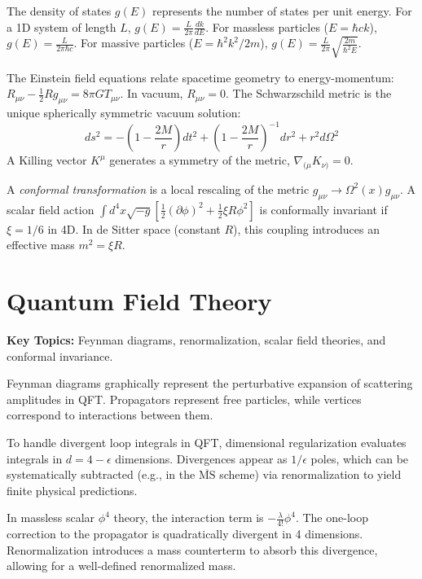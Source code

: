 \begin{definition}
The density of states $g(E)$ represents the number of states per unit energy. For a 1D system of length $L$, $g(E) = \frac{L}{2\pi} \frac{dk}{dE}$. For massless particles ($E = \hbar c k$), $g(E) = \frac{L}{2\pi \hbar c}$. For massive particles ($E = \hbar^2 k^2 / 2m$), $g(E) = \frac{L}{2\pi} \sqrt{\frac{2m}{\hbar^2 E}}$.
\end{definition}

\begin{definition}
The Einstein field equations relate spacetime geometry to energy-momentum: $R_{\mu\nu} - \frac{1}{2} R g_{\mu\nu} = 8\pi G T_{\mu\nu}$. In vacuum, $R_{\mu\nu} = 0$. The Schwarzschild metric is the unique spherically symmetric vacuum solution:
\[ ds^2 = -\left(1 - \frac{2M}{r}\right) dt^2 + \left(1 - \frac{2M}{r}\right)^{-1} dr^2 + r^2 d\Omega^2 \]
A Killing vector $K^\mu$ generates a symmetry of the metric, $\nabla_{(\mu} K_{\nu)} = 0$.
\end{definition}

\begin{definition}
A \emph{conformal transformation} is a local rescaling of the metric $g_{\mu\nu} \to \Omega^2(x) g_{\mu\nu}$. A scalar field action $\int d^4x \sqrt{-g} [\frac{1}{2}(\partial \phi)^2 + \frac{1}{2} \xi R \phi^2]$ is conformally invariant if $\xi = 1/6$ in 4D. In de Sitter space (constant $R$), this coupling introduces an effective mass $m^2 = \xi R$.
\end{definition}

\section{Quantum Field Theory}

\textbf{Key Topics:} Feynman diagrams, renormalization, scalar field theories, and conformal invariance.

\begin{definition}
Feynman diagrams graphically represent the perturbative expansion of scattering amplitudes in QFT. Propagators represent free particles, while vertices correspond to interactions between them.
\end{definition}

\begin{theorem}
To handle divergent loop integrals in QFT, dimensional regularization evaluates integrals in $d=4-\epsilon$ dimensions. Divergences appear as $1/\epsilon$ poles, which can be systematically subtracted (e.g., in the $\overline{\text{MS}}$ scheme) via renormalization to yield finite physical predictions.
\end{theorem}

\begin{example}
In massless scalar $\phi^4$ theory, the interaction term is $-\frac{\lambda}{4!} \phi^4$. The one-loop correction to the propagator is quadratically divergent in 4 dimensions. Renormalization introduces a mass counterterm to absorb this divergence, allowing for a well-defined renormalized mass.
\end{example}